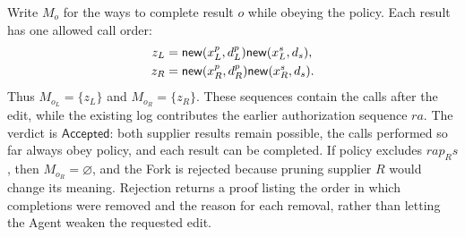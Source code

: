 Write \(M_o\) for the ways to complete result \(o\) while obeying the policy.
Each result has one allowed call order:
\[
\begin{aligned}
 z_L&=\mathsf{new}(x_L^p,d_L^p)\mathsf{new}(x_L^s,d_s),\\
 z_R&=\mathsf{new}(x_R^p,d_R^p)\mathsf{new}(x_R^s,d_s).
\end{aligned}
\]
Thus \(M_{o_L}=\{z_L\}\) and \(M_{o_R}=\{z_R\}\).
These sequences contain the calls after the edit, while the existing log contributes the earlier authorization sequence \(ra\).
The verdict is \(\mathsf{Accepted}\): both supplier results remain possible, the calls performed so far always obey policy, and each result can be completed.
If policy excludes \(rap_Rs\), then \(M_{o_R}=\varnothing\), and the Fork is rejected because pruning supplier \(R\) would change its meaning.
Rejection returns a proof listing the order in which completions were removed and the reason for each removal, rather than letting the Agent weaken the requested edit.
